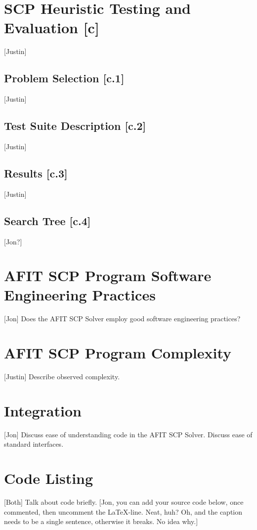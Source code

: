 \documentclass[12pt]{article}
\begin{document}
\section{SCP Heuristic Testing and Evaluation [c]} \label{scn:design}

[Justin]
\subsection{Problem Selection [c.1]}
[Justin]
\subsection{Test Suite Description [c.2]}
[Justin]
\subsection{Results [c.3]}
[Justin]
\subsection{Search Tree [c.4]} [Jon?]
\section{AFIT SCP Program Software Engineering Practices} \label{scn:design}

[Jon] Does the AFIT SCP Solver employ good software engineering practices?

\section{AFIT SCP Program Complexity} \label{scn:design}

[Justin] Describe observed complexity.

\section{Integration} \label{scn:design}

[Jon] Discuss ease of understanding code in the AFIT SCP Solver. Discuss ease of standard interfaces.

\pagebreak
\appendix		%

\section{Code Listing}

[Both] Talk about code briefly.
[Jon, you can add your source code below, once commented, then uncomment the \LaTeX -line. Neat, huh? Oh, and the caption needs to be a single sentence, otherwise it breaks. No idea why.]
%



\end{document}
